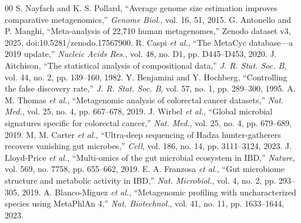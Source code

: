 \documentclass[conference]{IEEEtran}
\begin{document}
{\begin{thebibliography}{00}
 S. Nayfach and K. S. Pollard, ``Average genome size estimation improves comparative metagenomics,'' \emph{Genome Biol.}, vol. 16, 51, 2015.
 G. Antonello and P. Manghi, ``Meta-analysis of 22,710 human metagenomes,'' Zenodo dataset v3, 2025, doi:10.5281/zenodo.17567900.
 R. Caspi \emph{et al.}, ``The MetaCyc database---a 2019 update,'' \emph{Nucleic Acids Res.}, vol. 48, no. D1, pp. D445--D453, 2020.
 J. Aitchison, ``The statistical analysis of compositional data,'' \emph{J. R. Stat. Soc. B}, vol. 44, no. 2, pp. 139--160, 1982.
 Y. Benjamini and Y. Hochberg, ``Controlling the false discovery rate,'' \emph{J. R. Stat. Soc. B}, vol. 57, no. 1, pp. 289--300, 1995.
 A. M. Thomas \emph{et al.}, ``Metagenomic analysis of colorectal cancer datasets,'' \emph{Nat. Med.}, vol. 25, no. 4, pp. 667--678, 2019.
 J. Wirbel \emph{et al.}, ``Global microbial signatures specific for colorectal cancer,'' \emph{Nat. Med.}, vol. 25, no. 4, pp. 679--689, 2019.
 M. M. Carter \emph{et al.}, ``Ultra-deep sequencing of Hadza hunter-gatherers recovers vanishing gut microbes,'' \emph{Cell}, vol. 186, no. 14, pp. 3111--3124, 2023.
 J. Lloyd-Price \emph{et al.}, ``Multi-omics of the gut microbial ecosystem in IBD,'' \emph{Nature}, vol. 569, no. 7758, pp. 655--662, 2019.
 E. A. Franzosa \emph{et al.}, ``Gut microbiome structure and metabolic activity in IBD,'' \emph{Nat. Microbiol.}, vol. 4, no. 2, pp. 293--305, 2019.
 A. Blanco-Miguez \emph{et al.}, ``Metagenomic profiling with uncharacterized species using MetaPhlAn 4,'' \emph{Nat. Biotechnol.}, vol. 41, no. 11, pp. 1633--1644, 2023.
\end{thebibliography}}
\end{document}
